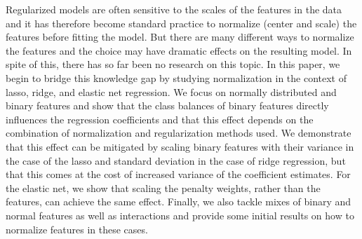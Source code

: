Regularized models are often sensitive to the scales of the features in the data and it has
therefore become standard practice to normalize (center and scale) the features before
fitting the model. But there are many different ways to normalize the features and the
choice may have dramatic effects on the resulting model. In spite of this, there has so far
been no research on this topic. In this paper, we begin to bridge this knowledge gap by
studying normalization in the context of lasso, ridge, and elastic net regression. We focus
on normally distributed and binary features and show that the class balances of binary
features directly influences the regression coefficients and that this effect depends on
the combination of normalization and regularization methods used. We demonstrate that this
effect can be mitigated by scaling binary features with their variance in the case of the
lasso and standard deviation in the case of ridge regression, but that this comes at the
cost of increased variance of the coefficient estimates. For the elastic net, we show that
scaling the penalty weights, rather than the features, can achieve the same effect.
Finally, we also tackle mixes of binary and normal features as well as interactions and
provide some initial results on how to normalize features in these cases.
